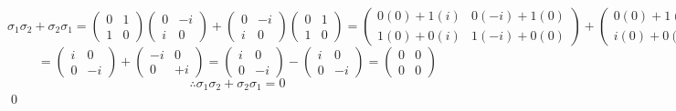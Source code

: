 \begin{itemize}
\[\sigma_1 \sigma_2 + \sigma_2\sigma_1= \begin{pmatrix} 0 & 1\\ 1 & 0
\end{pmatrix} \begin{pmatrix} 0 & -i \\ i & 0\end{pmatrix} + \begin{pmatrix} 0 & -i \\ i & 0 \end{pmatrix} \begin{pmatrix} 0 & 1 \\ 1 & 0 \end{pmatrix}= \begin{pmatrix} 0(0)+1(i) & 0(-i)+1(0)\\ 1(0)+0(i) & 1(-i)+0(0)\end{pmatrix}+\begin{pmatrix} 0(0)+1(-i) & 0(1)+-i(0)\\ i(0)+0(1) & i(1)+0(0)\end{pmatrix}\]\[=\begin{pmatrix} i & 0\\ 0 & -i\end{pmatrix}+\begin{pmatrix} -i & 0\\ 0 & +i\end{pmatrix}=\begin{pmatrix} i & 0 \\ 0 & -i\end{pmatrix} -\begin{pmatrix} i & 0 \\ 0 & -i \end{pmatrix} = \begin{pmatrix} 0 & 0 \\ 0 & 0\end{pmatrix}\]
\[\therefore \sigma_1 \sigma_2 + \sigma_2\sigma_1 = 0\]\qed
    

\end{itemize}
